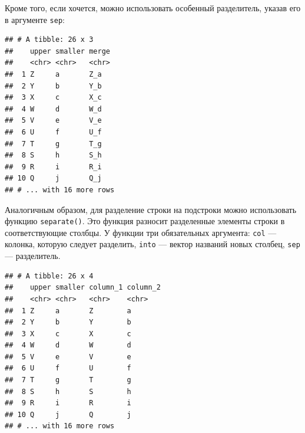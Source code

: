 \documentclass[
]{book}
\newenvironment{Shaded}{\begin{snugshade}}{\end{snugshade}}
\newcommand{\DataTypeTok}[1]{\textcolor[rgb]{0.13,0.29,0.53}{#1}}
\newcommand{\KeywordTok}[1]{\textcolor[rgb]{0.13,0.29,0.53}{\textbf{#1}}}
\newcommand{\NormalTok}[1]{#1}
\newcommand{\OperatorTok}[1]{\textcolor[rgb]{0.81,0.36,0.00}{\textbf{#1}}}
\newcommand{\StringTok}[1]{\textcolor[rgb]{0.31,0.60,0.02}{#1}}
\begin{document}
Кроме того, если хочется, можно использовать особенный разделитель, указав его в аргументе \texttt{sep}:

\begin{Shaded}
\end{Shaded}

\begin{verbatim}
## # A tibble: 26 x 3
##    upper smaller merge
##    <chr> <chr>   <chr>
##  1 Z     a       Z_a  
##  2 Y     b       Y_b  
##  3 X     c       X_c  
##  4 W     d       W_d  
##  5 V     e       V_e  
##  6 U     f       U_f  
##  7 T     g       T_g  
##  8 S     h       S_h  
##  9 R     i       R_i  
## 10 Q     j       Q_j  
## # ... with 16 more rows
\end{verbatim}

Аналогичным образом, для разделение строки на подстроки можно использовать функцию \texttt{separate()}. Это функция разносит разделенные элементы строки в соответствующие столбцы. У функции три обязательных аргумента: \texttt{col} --- колонка, которую следует разделить, \texttt{into} --- вектор названий новых столбец, \texttt{sep} --- разделитель.

\begin{Shaded}
\end{Shaded}

\begin{verbatim}
## # A tibble: 26 x 4
##    upper smaller column_1 column_2
##    <chr> <chr>   <chr>    <chr>   
##  1 Z     a       Z        a       
##  2 Y     b       Y        b       
##  3 X     c       X        c       
##  4 W     d       W        d       
##  5 V     e       V        e       
##  6 U     f       U        f       
##  7 T     g       T        g       
##  8 S     h       S        h       
##  9 R     i       R        i       
## 10 Q     j       Q        j       
## # ... with 16 more rows
\end{verbatim}
\end{document}
